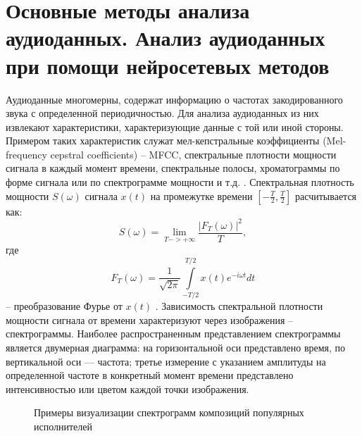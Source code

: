 \chapter{Основные методы анализа аудиоданных. Анализ аудиоданных при помощи нейросетевых методов}
Аудиоданные многомерны, содержат информацию о частотах закодированного звука с 
определенной периодичностью. 
Для анализа аудиоданных из них извлекают характеристики, характеризующие данные с той или иной стороны.
Примером таких характеристик служат мел-кепстральные коэффициенты (Mel-frequency cepstral coefficients) -- MFCC,
спектральные плотности мощности сигнала в каждый момент времени, 
спектральные полосы, хроматограммы по форме сигнала или по спектрограмме мощности и т.д. \cite{mus_zhao}.
Спектральная плотность мощности $S(\omega)$ сигнала $x(t)$ на промежутке времени $\left[-\frac{T}{2},\frac{T}{2}\right]$ расчитывается как:
\begin{equation}
	S(\omega) = \lim_{T->+\infty} \frac{\left|F_T(\omega)\right|^2}{T},
\end{equation}
где
\begin{equation}
	F_{T}(\omega )={\frac {1}{\sqrt {2\pi }}}\int \limits _{-T/2}^{T/2}x(t)e^{-i\omega t} dt
\end{equation}
-- преобразование Фурье	от $x(t)$ \cite{otnes}.
Зависимость спектральной плотности мощности сигнала от времени характеризуют через изображения -- спектрограммы.
Наиболее распространенным представлением спектрограммы является двумерная диаграмма: на горизонтальной оси представлено время, 
по вертикальной оси — частота; третье измерение с указанием амплитуды на определенной частоте в конкретный момент времени представлено 
интенсивностью или цветом каждой точки изображения.

\begin{figure}[H]
	\caption{Примеры визуализации спектрограмм композиций популярных исполнителей}
\end{figure}


